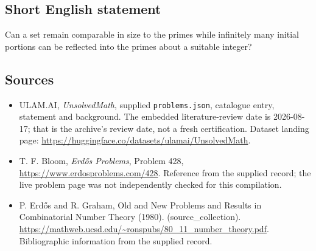 \documentclass[11pt,a4paper]{article}
\begin{document}
\subsection{Short English statement}

Can a set remain comparable in size to the primes while infinitely many initial portions can be reflected into the primes about a suitable integer?

\subsection{Sources}

{\small

\begin{itemize}

\item[\hypertarget{source:statement:1}{S1}] ULAM.AI, \emph{UnsolvedMath}, supplied \texttt{problems.json}, catalogue entry, statement and background. The embedded literature-review date is 2026-08-17; that is the archive’s review date, not a fresh certification. Dataset landing page: \url{https://huggingface.co/datasets/ulamai/UnsolvedMath}.

\item[\hypertarget{source:statement:2}{S2}] T. F. Bloom, \emph{Erdős Problems}, Problem 428, \url{https://www.erdosproblems.com/428}. Reference from the supplied record; the live problem page was not independently checked for this compilation.

\item[\hypertarget{source:statement:3}{S3}] P. Erdős and R. Graham, Old and New Problems and Results in Combinatorial Number Theory (1980). (source\_collection). \url{https://mathweb.ucsd.edu/~ronspubs/80_11_number_theory.pdf}. Bibliographic information from the supplied record.

\end{itemize}

}

\label{end:statement}
\end{document}

